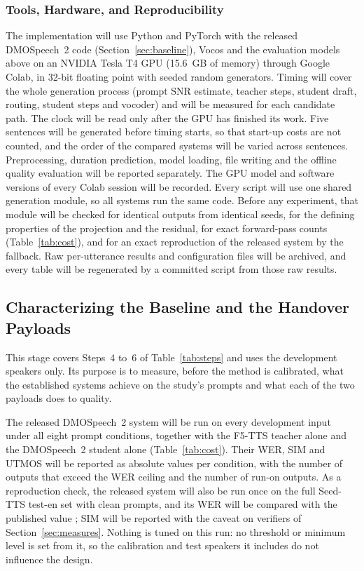\subsubsection{Tools, Hardware, and Reproducibility}
\label{sec:tools}

The implementation will use Python and PyTorch with the released DMOSpeech~2 code (Section~\ref{sec:baseline}), Vocos \parencite{siuzdak2024vocos} and the evaluation models above on an NVIDIA Tesla T4 GPU (15.6~GB of memory) through Google Colab, in 32-bit floating point with seeded random generators. Timing will cover the whole generation process (prompt SNR estimate, teacher steps, student draft, routing, student steps and vocoder) and will be measured for each candidate path. The clock will be read only after the GPU has finished its work. Five sentences will be generated before timing starts, so that start-up costs are not counted, and the order of the compared systems will be varied across sentences. Preprocessing, duration prediction, model loading, file writing and the offline quality evaluation will be reported separately. The GPU model and software versions of every Colab session will be recorded. Every script will use one shared generation module, so all systems run the same code. Before any experiment, that module will be checked for identical outputs from identical seeds, for the defining properties of the projection and the residual, for exact forward-pass counts (Table~\ref{tab:cost}), and for an exact reproduction of the released system by the fallback. Raw per-utterance results and configuration files will be archived, and every table will be regenerated by a committed script from those raw results.

\subsection{Characterizing the Baseline and the Handover Payloads}
\label{sec:obj1}

This stage covers Steps~4 to~6 of Table~\ref{tab:steps} and uses the development speakers only. Its purpose is to measure, before the method is calibrated, what the established systems achieve on the study's prompts and what each of the two payloads does to quality.

 The released DMOSpeech~2 system will be run on every development input under all eight prompt conditions, together with the F5-TTS teacher alone and the DMOSpeech~2 student alone (Table~\ref{tab:cost}). Their WER, SIM and UTMOS will be reported as absolute values per condition, with the number of outputs that exceed the WER ceiling and the number of run-on outputs. As a reproduction check, the released system will also be run once on the full Seed-TTS test-en set with clean prompts, and its WER will be compared with the published value \parencite{li2025dmospeech2}; SIM will be reported with the caveat on verifiers of Section~\ref{sec:measures}. Nothing is tuned on this run: no threshold or minimum level is set from it, so the calibration and test speakers it includes do not influence the design.

